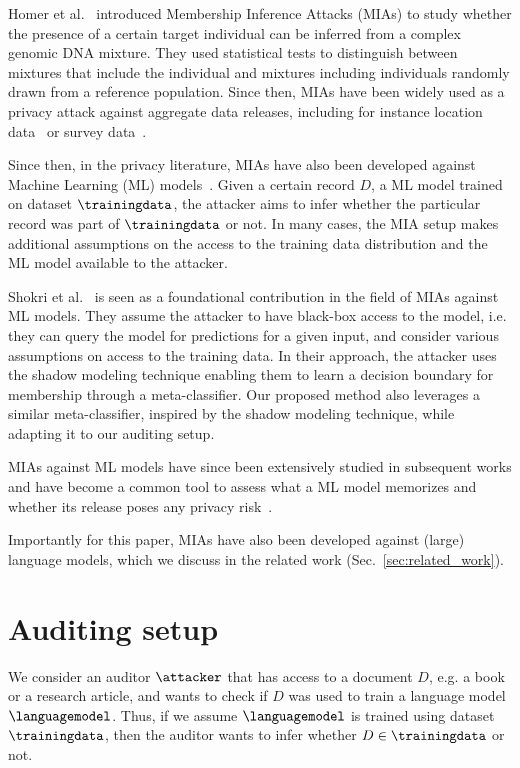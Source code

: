 \documentclass[twocolumn,10pt]{article}
\begin{document}
Homer et al.~\cite{homer2008resolving} introduced Membership Inference Attacks (MIAs) to study whether the presence of a certain target individual can be inferred from a complex genomic DNA mixture. They used statistical tests to distinguish between mixtures that include the individual and mixtures including individuals randomly drawn from a reference population. 
Since then, MIAs have been widely used as a privacy attack against aggregate data releases, including for instance location data~\cite{pyrgelis2017knock} or survey data~\cite{bauer2020towards}.

Since then, in the privacy literature, MIAs have also been developed against Machine Learning (ML) models~\cite{shokri2017membership,truex2019demystifying,feldman2020does,carlini2022membership,hu2022membership}. Given a certain record $D$, a ML model trained on dataset $\trainingdata$, the attacker aims to infer whether the particular record was part of $\trainingdata$ or not. In many cases, the MIA setup makes additional assumptions on the access to the training data distribution and the ML model available to the attacker. 

Shokri et al.~\cite{shokri2017membership} is seen as a foundational contribution in the field of MIAs against ML models. They assume the attacker to have black-box access to the model, i.e. they can query the model for predictions for a given input, and consider various assumptions on access to the training data. In their approach, the attacker uses the shadow modeling technique enabling them to learn a decision boundary for membership through a meta-classifier. Our proposed method also leverages a similar meta-classifier, inspired by the shadow modeling technique, while adapting it to our auditing setup.

MIAs against ML models have since been extensively studied in subsequent works and have become a common tool to assess what a ML model memorizes and whether its release poses any privacy risk~\cite{hu2022membership,carlini2022membership,song2019auditing,feldman2020does,meeus2023achilles,cretu2023re}.

Importantly for this paper, MIAs have also been developed against (large) language models, which we discuss in the related work (Sec.~\ref{sec:related_work}).  
 

\section{Auditing setup}
We consider an auditor $\attacker$ that has access to a document $D$, e.g. a book or a research article, and wants to check if $D$ was used to train a language model $\languagemodel$. Thus, if we assume $\languagemodel$ is trained using dataset $\trainingdata$, then the auditor wants to infer whether $D \in \trainingdata$ or not. 
\end{document}
